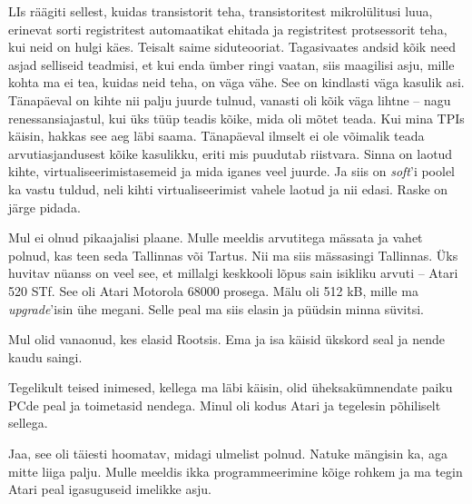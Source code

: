 
LIs räägiti sellest, 
kuidas transistorit teha, transistoritest 
mikrolülitusi luua, erinevat sorti 
registritest automaatikat ehitada ja registritest protsessorit teha, kui neid on 
hulgi käes. Teisalt saime siduteooriat. Tagasivaates andsid kõik need asjad selliseid teadmisi, et kui 
enda ümber ringi vaatan, siis maagilisi asju, mille kohta ma ei tea, 
kuidas neid teha, on väga vähe. See on kindlasti väga kasulik asi. Tänapäeval on kihte nii 
palju juurde tulnud, vanasti oli kõik väga lihtne – nagu 
renessansiajastul, kui üks tüüp teadis kõike, mida oli mõtet teada. 
Kui mina TPIs käisin, hakkas see aeg läbi saama. Tänapäeval ilmselt ei ole võimalik teada arvutiasjandusest kõike 
kasulikku, eriti mis puudutab riistvara. Sinna on laotud kihte, virtualiseerimistasemeid ja mida iganes veel juurde. Ja siis on \emph{soft}'i poolel ka vastu 
tuldud, neli kihti virtualiseerimist vahele laotud ja nii edasi. Raske on järge pidada.


Mul ei olnud pikaajalisi plaane. Mulle meeldis arvutitega mässata ja vahet polnud, kas teen seda Tallinnas või 
Tartus. Nii ma siis mässasingi Tallinnas. Üks huvitav nüanss 
on veel see, et millalgi keskkooli lõpus sain isikliku arvuti – Atari 520 STf. See
oli Atari Motorola 68000 prosega. Mälu oli 512 kB, mille ma 
\emph{upgrade}'isin ühe megani. Selle peal ma siis elasin ja püüdsin minna süvitsi. 


Mul olid vanaonud, kes elasid Rootsis. Ema ja isa käisid ükskord seal ja nende
kaudu saingi. 


Tegelikult teised inimesed, kellega ma läbi käisin, olid üheksakümnendate paiku PCde peal ja 
toimetasid nendega. Minul oli kodus Atari ja tegelesin 
põhiliselt sellega. 


Jaa, see oli täiesti hoomatav, midagi ulmelist 
polnud. Natuke mängisin ka, aga mitte liiga palju. Mulle meeldis ikka 
programmeerimine kõige rohkem ja ma tegin Atari peal igasuguseid imelikke asju.

